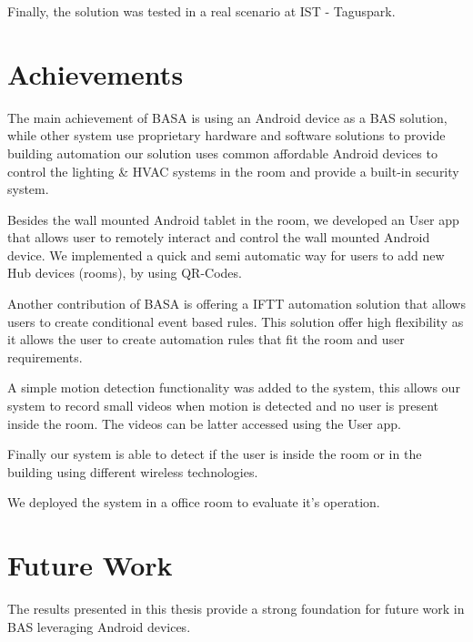 Finally, the solution was tested in a real scenario  at IST - Taguspark.


\section{Achievements}
\label{section:achievements}

The main achievement of BASA is using an Android device as a \ac{BAS} solution, while other system use proprietary hardware and software solutions to provide building automation our solution uses common affordable Android devices to control the lighting \& \ac{HVAC} systems in the room and provide a built-in security system. 

Besides the wall mounted Android tablet in the room, we developed an User app that allows user to remotely interact and control the wall mounted Android device. We implemented a quick and semi automatic way for users to add new Hub devices (rooms), by using QR-Codes.


Another contribution of BASA is offering a \ac{IFTT} automation solution that allows users to create conditional event based rules. This solution offer high flexibility as it allows the user to create automation rules that fit the room and user requirements.

A simple motion detection functionality was added to the system, this allows our system to record small videos when motion is detected and no user is present inside the room. The videos can be latter accessed using the User app.

Finally our system is able to detect if the user is inside the room or in the building using different wireless technologies.


We deployed the system in a office room to evaluate it's operation. 






\section{Future Work}
\label{section:future}

The results presented in this thesis provide a strong foundation for future work in \ac{BAS} leveraging Android devices. 

